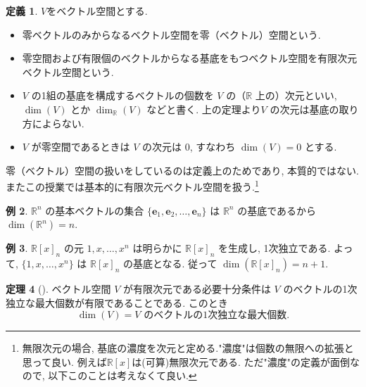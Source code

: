 \documentclass[dvipdfmx,a4paper,11pt]{article} %
\newcommand{\R}{\mathbb{R}}
\theoremstyle{definition}
\newtheorem{thm}{定理}[section]
\newtheorem{defn}[thm]{定義}
\newtheorem{ex}[thm]{例}
\begin{document}
\begin{defn}
$V$をベクトル空間とする.
\begin{itemize}
\item 零ベクトルのみからなるベクトル空間を零（ベクトル）空間という.
\item 零空間および有限個のベクトルからなる基底をもつベクトル空間を有限次元ベクトル空間という.
\item $V$ の1組の基底を構成するベクトルの個数を $V$ の（$\mathbb{R}$ 上の）次元といい, $\dim(V)$ とか $\dim_{\mathbb{R}}(V)$ などと書く. 上の定理より$V$ の次元は基底の取り方によらない.
\item $V$ が零空間であるときは $V$ の次元は $0$, すなわち $\dim(V)=0$ とする.
\end{itemize}
\end{defn}
零（ベクトル）空間の扱いをしているのは定義上のためであり, 本質的ではない. 
またこの授業では基本的に有限次元ベクトル空間を扱う.\footnote{無限次元の場合, 基底の濃度を次元と定める."濃度"は個数の無限への拡張と思って良い. 例えば$\R[x]$は(可算)無限次元である. ただ"濃度"の定義が面倒なので, 以下このことは考えなくて良い.}


\begin{ex}%
$\mathbb{R}^n$ の基本ベクトルの集合 $\{\bm{e}_1,\bm{e}_2,\ldots,\bm{e}_n\}$ は $\mathbb{R}^n$ の基底であるから
\(
\dim(\mathbb{R}^n)=n.
\)
\end{ex}

\begin{ex}%
$\mathbb{R}[x]_n$ の元 $1,x,\ldots,x^n$ は明らかに $\mathbb{R}[x]_n$ を生成し, 1次独立である. よって, $\{1,x,\ldots,x^n\}$ は $\mathbb{R}[x]_n$ の基底となる. 従って
\(
\dim(\mathbb{R}[x]_n)=n+1.
\)
\end{ex}


\begin{thm}[{\cite[定理4.4.2]{M}}] 
\label{thm-M-4.4.2}
ベクトル空間 $V$ が有限次元である必要十分条件は $V$ のベクトルの1次独立な最大個数が有限であることである. このとき
\[
\dim(V)=V\text{ のベクトルの1次独立な最大個数}.
\]
\end{thm}
\end{document}
